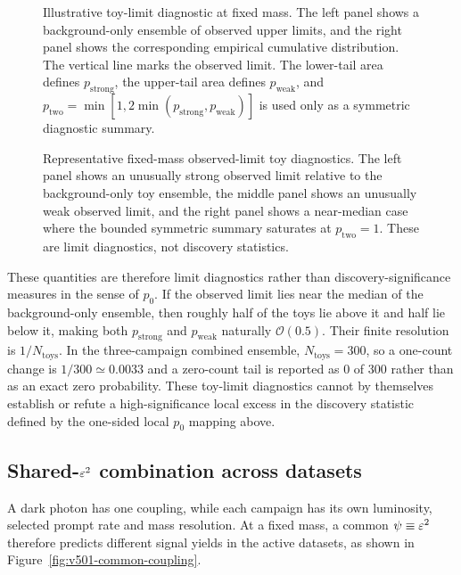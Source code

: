 \begin{figure}[H]
\centering
{}
\caption{Illustrative toy-limit diagnostic at fixed mass. The left panel shows a
background-only ensemble of observed \CLs{} upper limits, and the right panel shows the
corresponding empirical cumulative distribution. The vertical line marks the observed
limit. The lower-tail area defines $p_{\mathrm{strong}}$, the upper-tail area defines
$p_{\mathrm{weak}}$, and
$p_{\mathrm{two}}=\min[1,2\min(p_{\mathrm{strong}},p_{\mathrm{weak}})]$ is used only
as a symmetric diagnostic summary.}
\label{fig:pvalue-tail-schematic}
\end{figure}

\begin{figure}[H]
\centering
{}
\caption{Representative fixed-mass observed-limit toy diagnostics. The left panel
shows an unusually strong observed limit relative to the background-only toy
ensemble, the middle panel shows an unusually weak observed limit, and the right
panel shows a near-median case where the bounded symmetric summary saturates at
$p_{\mathrm{two}}=1$. These are limit diagnostics, not discovery
statistics.}
\label{fig:pvalue-tail-examples}
\end{figure}

These quantities are therefore limit diagnostics rather than discovery-significance
measures in the sense of $p_0$. If the observed limit lies near the median of the
background-only ensemble, then roughly half of the toys lie above it and half lie
below it, making both $p_{\mathrm{strong}}$ and $p_{\mathrm{weak}}$ naturally
$\mathcal{O}(0.5)$. Their finite resolution is $1/N_{\mathrm{toys}}$. In the
three-campaign combined ensemble, $N_{\mathrm{toys}}=300$, so a one-count change is
$1/300\simeq0.0033$ and a zero-count tail is reported as 0 of 300 rather than as an
exact zero probability. These toy-limit diagnostics cannot by themselves establish
or refute a high-significance local excess in the discovery statistic defined by the
one-sided local $p_0$ mapping above.

\subsection{Shared-\texorpdfstring{$\varepsilon^2$}{epsilon2} combination across datasets}
\label{sec:combination}

A dark photon has one coupling, while each campaign has its own luminosity,
selected prompt rate and mass resolution. At a fixed mass, a common
$\psi\equiv\varepsilon^2$ therefore predicts different signal yields in the active
datasets, as shown in Figure~\ref{fig:v501-common-coupling}.

